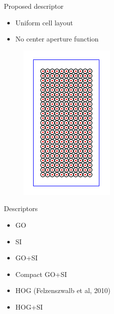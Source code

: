 \documentclass[14pt,t]{beamer}
\begin{document}
\begin{frame}{Proposed descriptor}
\begin{minipage}[t]{0.49\textwidth}
\begin{itemize}
\item Uniform cell layout
\item No center aperture function
\end{itemize}
\end{minipage}
\begin{minipage}[t]{0.49\textwidth}
\begin{figure}
	\includegraphics[height=0.7\textheight, clip=true, trim=9 9 9 9]{img/pedestrianWindowGrid.pdf}
\end{figure}
\end{minipage}
\end{frame}
%
\begin{frame}[c]{Descriptors}
\begin{itemize}
	\item GO
	\vspace{0.3cm}
	\item SI
	\vspace{0.3cm}
	\item GO+SI
	\vspace{0.3cm}
	\item Compact GO+SI
	\vspace{0.3cm}
	\item HOG (Felzenszwalb et al, 2010)
	\vspace{0.3cm}
	\item HOG+SI
\end{itemize}
\end{frame}
%
\end{document}
